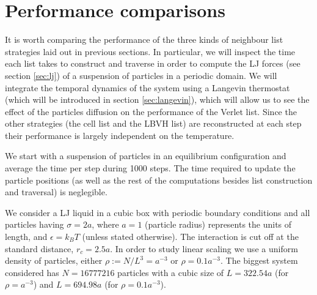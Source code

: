 \documentclass[twoside,openright,titlepage,numbers=noenddot,%
headinclude,footinclude,cleardoublepage=empty,abstract=on,
BCOR=5mm,fontsize=11pt, dvipsnames, paper=b5
]{scrreprt}
\newcommand{\kT}{k_B T}
\begin{document}
\section{Performance comparisons}

It is worth comparing the performance of the three kinds of neighbour list strategies laid out in previous sections. In particular, we will inspect the time each list takes to construct and traverse in order to compute the \gls{LJ} forces (see section \ref{sec:lj}) of a suspension of particles in a periodic domain. We will integrate the temporal dynamics of the system using a Langevin thermostat (which will be introduced in section \ref{sec:langevin}), which will allow us to see the effect of the particles diffusion on the performance of the Verlet list. Since the other strategies (the cell list and the LBVH list) are reconstructed at each step their performance is largely independent on the temperature.

We start with a suspension of particles in an equilibrium configuration and average the time per step during 1000 steps. The time required to update the particle positions (as well as the rest of the computations besides list construction and traversal) is neglegible.

We consider a LJ liquid in a cubic box with periodic boundary conditions and all particles having $\sigma = 2a$, where $a=1$ (particle radius) represents the units of length, and $\epsilon = \kT$ (unless stated otherwise). The interaction is cut off at the standard distance, $r_c=2.5a$. In order to study linear scaling we use a uniform density of particles, either $\rho :=N/L^3= a^{-3}$ or $\rho = 0.1a^{-3}$. The biggest system considered has $N=16777216$ particles with a cubic size of $L=322.54a$ (for $\rho=a^{-3}$) and $L=694.98a$ (for $\rho=0.1a^{-3}$).
\end{document}
